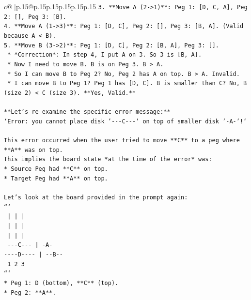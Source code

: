 \documentclass{article}
\begin{document}
{\begin{supertabular}{c@{$\;$}|p{.15\linewidth}@{}p{.15\linewidth}p{.15\linewidth}p{.15\linewidth}p{.15\linewidth}p{.15\linewidth}}
{{{\texttt{3.  **Move A (2{-}>1)**: Peg 1: {[}D, C, A{]}, Peg 2: {[}{]}, Peg 3: {[}B{]}.} \\
\texttt{4.  **Move A (1{-}>3)**: Peg 1: {[}D, C{]}, Peg 2: {[}{]}, Peg 3: {[}B, A{]}. (Valid because A < B).} \\
\texttt{5.  **Move B (3{-}>2)**: Peg 1: {[}D, C{]}, Peg 2: {[}B, A{]}, Peg 3: {[}{]}.} \\
\texttt{    *   *Correction*: In step 4, I put A on 3. So 3 is {[}B, A{]}.} \\
\texttt{    *   Now I need to move B. B is on Peg 3. B > A.} \\
\texttt{    *   So I can move B to Peg 2? No, Peg 2 has A on top. B > A. Invalid.} \\
\texttt{    *   I can move B to Peg 1? Peg 1 has {[}D, C{]}. B is smaller than C? No, B (size 2) < C (size 3). **Yes, Valid.**} \\
\\ 
\texttt{**Let's re{-}examine the specific error message:**} \\
\texttt{`Error: you cannot place disk '{-}{-}{-}C{-}{-}{-}' on top of smaller disk '{-}A{-}'!`} \\
\\ 
\texttt{This error occurred when the user tried to move **C** to a peg where **A** was on top.} \\
\texttt{This implies the board state *at the time of the error* was:} \\
\texttt{*   Source Peg had **C** on top.} \\
\texttt{*   Target Peg had **A** on top.} \\
\\ 
\texttt{Let's look at the board provided in the prompt again:} \\
\texttt{```} \\
\texttt{    |         |         |    } \\
\texttt{    |         |         |    } \\
\texttt{    |         |         |    } \\
\texttt{ {-}{-}{-}C{-}{-}{-}      |        {-}A{-}   } \\
\texttt{{-}{-}{-}{-}D{-}{-}{-}{-}     |       {-}{-}B{-}{-}  } \\
\texttt{    1         2         3    } \\
\texttt{```} \\
\texttt{*   Peg 1: D (bottom), **C** (top).} \\
\texttt{*   Peg 2: **A**.} \\
}}}
\end{supertabular}}
\end{document}
